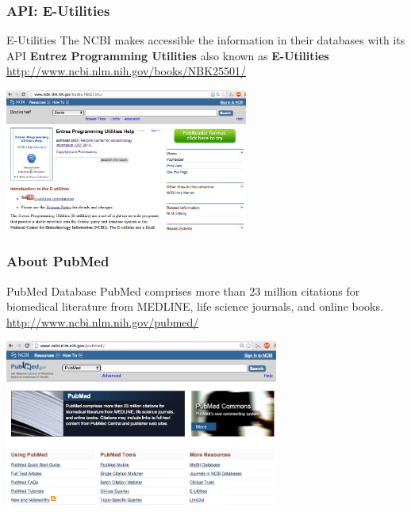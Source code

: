 \documentclass{beamer}\usepackage[]{graphicx}\usepackage[]{color}
\begin{document}

\begin{frame}
\frametitle{API: E-Utilities}

\begin{block}{E-Utilities}
The NCBI makes accessible the information in their databases with its API \textbf{Entrez Programming Utilities} also known as \textbf{E-Utilities} \\
{\scriptsize \url{http://www.ncbi.nlm.nih.gov/books/NBK25501/}}
\end{block}

\begin{center}
\includegraphics[width=8cm]{images/eutilities_webpage.png}
\end{center}

\end{frame}


\begin{frame}
\frametitle{About PubMed}

\begin{block}{PubMed Database}
PubMed comprises more than 23 million citations for biomedical literature from MEDLINE, life science journals, and online books. \\
{\scriptsize \url{http://www.ncbi.nlm.nih.gov/pubmed/}}
\end{block}

\begin{center}
\includegraphics[width=9cm]{images/pubmed_webpage.png}
\end{center}

\end{frame}
\end{document}

